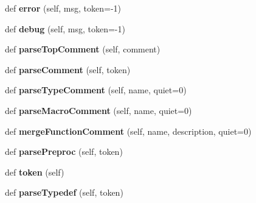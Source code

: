 \begin{DoxyCompactItemize}
\item 
\mbox{\label{classapibuild_1_1_c_parser_a94139d22f9dc919b29b909a17369a380}} 
def {\bfseries error} (self, msg, token=-\/1)
\item 
\mbox{\label{classapibuild_1_1_c_parser_a36732e4b43fcfb41c5853dcbf3dc2f0c}} 
def {\bfseries debug} (self, msg, token=-\/1)
\item 
\mbox{\label{classapibuild_1_1_c_parser_a56db9422069c0f487f55ee4d67d054eb}} 
def {\bfseries parse\+Top\+Comment} (self, comment)
\item 
\mbox{\label{classapibuild_1_1_c_parser_ab4495b022d3795a6e6d9681393036182}} 
def {\bfseries parse\+Comment} (self, token)
\item 
\mbox{\label{classapibuild_1_1_c_parser_af73e499253968c3cfab9ff47b6e2b1be}} 
def {\bfseries parse\+Type\+Comment} (self, name, quiet=0)
\item 
\mbox{\label{classapibuild_1_1_c_parser_a542e8811a6d10b29fb2e3ced24ed00cd}} 
def {\bfseries parse\+Macro\+Comment} (self, name, quiet=0)
\item 
\mbox{\label{classapibuild_1_1_c_parser_a2b452be0d322f822da1cf50f25efa894}} 
def {\bfseries merge\+Function\+Comment} (self, name, description, quiet=0)
\item 
\mbox{\label{classapibuild_1_1_c_parser_aa721a288372982202e6382196a6caf51}} 
def {\bfseries parse\+Preproc} (self, token)
\item 
\mbox{\label{classapibuild_1_1_c_parser_a8dad44a507f9433112baea7756755107}} 
def {\bfseries token} (self)
\item 
\mbox{\label{classapibuild_1_1_c_parser_a9fd1450bc1671b5a3c15f7c84200e938}} 
def {\bfseries parse\+Typedef} (self, token)
\item 
\mbox{\label{classapibuild_1_1_c_parser_ad43bb0d6155cd234eb65051a276cf38b}} 

\end{DoxyCompactItemize}
